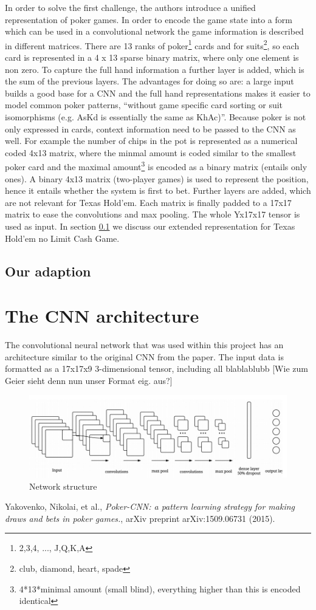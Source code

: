 \documentclass[]{report}
\begin{document}
In order to solve the first challenge, the authors introduce a unified
representation of poker games. In order to encode the game state into
a form which can be used in a convolutional network the game information
is described in different matrices. There are 13 ranks of poker\footnote{2,3,4, ..., J,Q,K,A}
cards and for suits\footnote{club, diamond, heart, spade}, so each
card is represented in a 4 x 13 sparse binary matrix, where only one
element is non zero. To capture the full hand information a further
layer is added, which is the sum of the previous layers. The advantages
for doing so are: a large input builds a good base for a CNN and the
full hand representations makes it easier to model common poker patterns,
``without game specific card sorting or suit isomorphisms (e.g. AsKd
is essentially the same as KhAc)''.\cite{1} Because
poker is not only expressed in cards, context information need to
be passed to the CNN as well. For example the number of chips in the
pot is represented as a numerical coded 4x13 matrix, where the minmal
amount is coded similar to the smallest poker card and the maximal
amount\footnote{4{*}13{*}minimal amount (small blind), everything higher than this
is encoded identical} is encoded as a binary matrix (entails only ones). A binary 4x13
matrix (two-player games) is used to represent the position, hence
it entails whether the system is first to bet. Further layers are
added, which are not relevant for Texas Hold'em. Each matrix is finally
padded to a 17x17 matrix to ease the convolutions and max pooling.
The whole Yx17x17 tensor is used as input. In section \ref{adapted_p}
we discuss our extended representation for Texas Hold'em no Limit
Cash Game.

\subsection{Our adaption} \label{adapted_p}
\section{The CNN architecture}

The convolutional neural network that was used within this project has an architecture similar to the original CNN from the paper\cite{1}. The input data is formatted as a 17x17x9 3-dimensional tensor, including all blablablubb [Wie zum Geier sieht denn nun unser Format eig. aus?]


\begin{figure}[h]
	\caption{Network structure}
	\includegraphics[scale = 0.5]{cnn_structure.jpg}
\end{figure}

\begin{thebibliography}{}
	 Yakovenko, Nikolai, et al., \emph{Poker-CNN: a pattern learning strategy for making draws and bets in poker games.}, arXiv preprint arXiv:1509.06731 (2015).
\end{thebibliography}  
\end{document}
